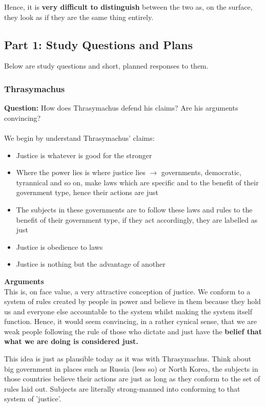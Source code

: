 \documentclass[12pt, letterpaper]{article}
\begin{document}
Hence, it is \textbf{very difficult to distinguish} between the two as, on the surface, they look as if they are the same thing entirely.


\subsection{Part 1: Study Questions and Plans}
Below are study questions and short, planned responses to them.
\subsubsection{Thrasymachus}
\textbf{Question:} How does Thrasymachus defend his claims? Are his arguments convincing?\\\\
We begin by understand Thrasymachus' claims:
\begin{itemize}
	\item Justice is whatever is good for the stronger
	\item Where the power lies is where justice lies $\rightarrow$ governments, democratic, tyrannical and so on, make laws which are specific and to the benefit of their government type, hence their actions are just
	\item The subjects in these governments are to follow these laws and rules to the benefit of their government type, if they act accordingly, they are labelled as just
	\item Justice is obedience to laws
	\item Justice is nothing but the advantage of another
\end{itemize}
\textbf{Arguments}\\
This is, on face value, a very attractive conception of justice. We conform to a system of rules created by people in power and believe in them because they hold us and everyone else accountable to the system whilst making the system itself function. Hence, it would seem convincing, in a rather cynical sense, that we are weak people following the rule of those who dictate and just have the \textbf{belief that what we are doing is considered just.}

This idea is just as plausible today as it was with Thrasymachus. Think about big government in places such as Russia (less so) or North Korea, the subjects in those countries believe their actions are just as long as they conform to the set of rules laid out. Subjects are literally strong-manned into conforming to that system of 'justice'.
\end{document}
